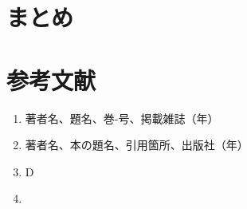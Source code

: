 \documentclass[9pt, twocolumn, a4paper]{jsarticle_kijou}
\begin{document}
\section{まとめ}



\section*{\small 参考文献}{
\small
\begin{enumerate}
\renewcommand{\labelenumi}{\arabic{enumi}).}
  \item 著者名、題名、巻-号、掲載雑誌（年）
  \item 著者名、本の題名、引用箇所、出版社（年）
  \item D
  \item 
\end{enumerate}
}
\end{document}
